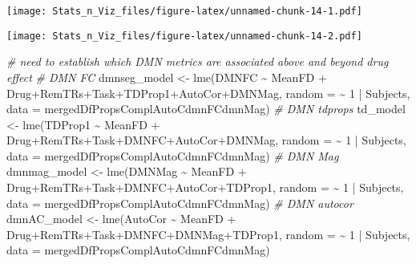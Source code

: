 \documentclass[
]{article}
\newenvironment{Shaded}{\begin{snugshade}}{\end{snugshade}}
\newcommand{\AttributeTok}[1]{\textcolor[rgb]{0.77,0.63,0.00}{#1}}
\newcommand{\CommentTok}[1]{\textcolor[rgb]{0.56,0.35,0.01}{\textit{#1}}}
\newcommand{\DecValTok}[1]{\textcolor[rgb]{0.00,0.00,0.81}{#1}}
\newcommand{\FunctionTok}[1]{\textcolor[rgb]{0.00,0.00,0.00}{#1}}
\newcommand{\NormalTok}[1]{#1}
\newcommand{\OtherTok}[1]{\textcolor[rgb]{0.56,0.35,0.01}{#1}}
\newcommand{\SpecialCharTok}[1]{\textcolor[rgb]{0.00,0.00,0.00}{#1}}
\newcommand{\StringTok}[1]{\textcolor[rgb]{0.31,0.60,0.02}{#1}}
\begin{document}
\texttt{[image: Stats\_n\_Viz\_files/figure-latex/unnamed-chunk-14-1.pdf]}

\begin{Shaded}
\end{Shaded}

\texttt{[image: Stats\_n\_Viz\_files/figure-latex/unnamed-chunk-14-2.pdf]}

\begin{Shaded}
\begin{Highlighting}[]
\CommentTok{\# need to establish which DMN metrics are associated above and beyond drug effect}
\CommentTok{\# DMN FC}
\NormalTok{dmnseg\_model }\OtherTok{\textless{}{-}} \FunctionTok{lme}\NormalTok{(DMNFC }\SpecialCharTok{\textasciitilde{}}\NormalTok{ MeanFD }\SpecialCharTok{+}\NormalTok{ Drug}\SpecialCharTok{+}\NormalTok{RemTRs}\SpecialCharTok{+}\NormalTok{Task}\SpecialCharTok{+}\NormalTok{TDProp1}\SpecialCharTok{+}\NormalTok{AutoCor}\SpecialCharTok{+}\NormalTok{DMNMag, }\AttributeTok{random =} \SpecialCharTok{\textasciitilde{}} \DecValTok{1} \SpecialCharTok{|}\NormalTok{ Subjects, }\AttributeTok{data =}\NormalTok{ mergedDfPropsComplAutoCdmnFCdmnMag)}
\CommentTok{\# DMN tdprops}
\NormalTok{td\_model }\OtherTok{\textless{}{-}} \FunctionTok{lme}\NormalTok{(TDProp1 }\SpecialCharTok{\textasciitilde{}}\NormalTok{ MeanFD }\SpecialCharTok{+}\NormalTok{ Drug}\SpecialCharTok{+}\NormalTok{RemTRs}\SpecialCharTok{+}\NormalTok{Task}\SpecialCharTok{+}\NormalTok{DMNFC}\SpecialCharTok{+}\NormalTok{AutoCor}\SpecialCharTok{+}\NormalTok{DMNMag, }\AttributeTok{random =} \SpecialCharTok{\textasciitilde{}} \DecValTok{1} \SpecialCharTok{|}\NormalTok{ Subjects, }\AttributeTok{data =}\NormalTok{ mergedDfPropsComplAutoCdmnFCdmnMag)}
\CommentTok{\# DMN Mag}
\NormalTok{dmnmag\_model }\OtherTok{\textless{}{-}} \FunctionTok{lme}\NormalTok{(DMNMag }\SpecialCharTok{\textasciitilde{}}\NormalTok{ MeanFD }\SpecialCharTok{+}\NormalTok{ Drug}\SpecialCharTok{+}\NormalTok{RemTRs}\SpecialCharTok{+}\NormalTok{Task}\SpecialCharTok{+}\NormalTok{DMNFC}\SpecialCharTok{+}\NormalTok{AutoCor}\SpecialCharTok{+}\NormalTok{TDProp1, }\AttributeTok{random =} \SpecialCharTok{\textasciitilde{}} \DecValTok{1} \SpecialCharTok{|}\NormalTok{ Subjects, }\AttributeTok{data =}\NormalTok{ mergedDfPropsComplAutoCdmnFCdmnMag)}
\CommentTok{\# DMN autocor}
\NormalTok{dmnAC\_model }\OtherTok{\textless{}{-}} \FunctionTok{lme}\NormalTok{(AutoCor }\SpecialCharTok{\textasciitilde{}}\NormalTok{ MeanFD }\SpecialCharTok{+}\NormalTok{ Drug}\SpecialCharTok{+}\NormalTok{RemTRs}\SpecialCharTok{+}\NormalTok{Task}\SpecialCharTok{+}\NormalTok{DMNFC}\SpecialCharTok{+}\NormalTok{DMNMag}\SpecialCharTok{+}\NormalTok{TDProp1, }\AttributeTok{random =} \SpecialCharTok{\textasciitilde{}} \DecValTok{1} \SpecialCharTok{|}\NormalTok{ Subjects, }\AttributeTok{data =}\NormalTok{ mergedDfPropsComplAutoCdmnFCdmnMag)}


\end{Highlighting}
\end{Shaded}
\end{document}
